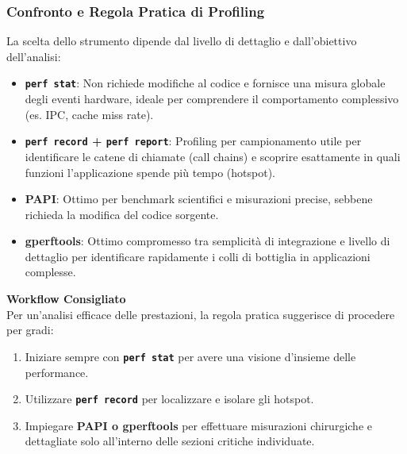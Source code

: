 \subsubsection*{Confronto e Regola Pratica di Profiling}
La scelta dello strumento dipende dal livello di dettaglio e dall'obiettivo dell'analisi:

\begin{itemize}
    \item \textbf{\texttt{perf stat}}: Non richiede modifiche al codice e fornisce una misura globale degli eventi hardware, ideale per comprendere il comportamento complessivo (es. IPC, cache miss rate).
    \item \textbf{\texttt{perf record} + \texttt{perf report}}: Profiling per campionamento utile per identificare le catene di chiamate (call chains) e scoprire esattamente in quali funzioni l'applicazione spende più tempo (hotspot).
    \item \textbf{PAPI}: Ottimo per benchmark scientifici e misurazioni precise, sebbene richieda la modifica del codice sorgente.
    \item \textbf{gperftools}: Ottimo compromesso tra semplicità di integrazione e livello di dettaglio per identificare rapidamente i colli di bottiglia in applicazioni complesse.
\end{itemize}

\textbf{Workflow Consigliato} \\
Per un'analisi efficace delle prestazioni, la regola pratica suggerisce di procedere per gradi:
\begin{enumerate}
    \item Iniziare sempre con \textbf{\texttt{perf stat}} per avere una visione d'insieme delle performance.
    \item Utilizzare \textbf{\texttt{perf record}} per localizzare e isolare gli hotspot.
    \item Impiegare \textbf{PAPI o gperftools} per effettuare misurazioni chirurgiche e dettagliate solo all'interno delle sezioni critiche individuate.
\end{enumerate}